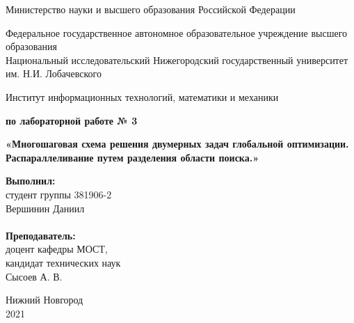 \documentclass{report}
\begin{document}
\begin{titlepage}

\begin{center}
Министерство науки и высшего образования Российской Федерации
\end{center}

\begin{center}
Федеральное государственное автономное образовательное учреждение высшего образования \\
Национальный исследовательский Нижегородский государственный университет им. Н.И. Лобачевского
\end{center}

\begin{center}
Институт информационных технологий, математики и механики
\end{center}

\vspace{4em}

\begin{center}
\textbf{ по лабораторной работе № 3} \\
\end{center}
\begin{center}
\textbf{\Large«Многошаговая схема решения двумерных задач глобальной оптимизации. 
	Распараллеливание путем разделения области поиска.»} \\
\end{center}

\vspace{4em}

\newbox{\lbox}
\newlength{\maxl}
\setlength{\maxl}{\wd\lbox}
\hfill\parbox{7cm}{
\hspace*{5cm}\hspace*{-5cm}\textbf{Выполнил:} \\ студент группы 381906-2 \\ Вершинин Даниил\\
\\
\hspace*{5cm}\hspace*{-5cm}\textbf{Преподаватель:}\\ доцент кафедры МОСТ, \\ кандидат технических наук \\ Сысоев А. В.\\
}
\vspace{\fill}

\begin{center} Нижний Новгород \\ 2021 \end{center}

\end{titlepage}
\end{document}
